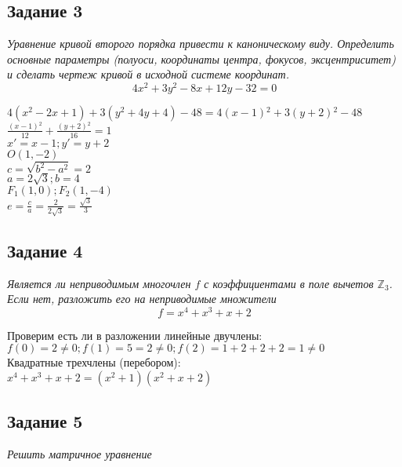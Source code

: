 \documentclass[a4paper]{article}
\theoremstyle{definition}
\theoremstyle{plain}
\begin{document}
\subsection*{Задание 3}

\emph{Уравнение кривой второго порядка привести к каноническому виду.
Определить основные параметры (полуоси, координаты центра, фокусов, эксцентриситет) и сделать чертеж кривой в исходной системе координат.}
\[
4x^{2}+3y^{2}-8x+12y-32=0
\]

$4(x^{2}-2x+1) + 3(y^{2}+4y+4) - 48 = 4(x-1){}^{2} + 3(y + 2){}^{2} - 48$\\
$\frac{(x-1){}^{2}}{12} + \frac{(y+2){}^{2}}{16} = 1$\\
$x' = x - 1; y' = y + 2$\\
$O(1, -2)$\\
$c = \sqrt{b^{2}-a^{2}} = 2$\\
$a = 2\sqrt{3}; b = 4$\\
$F_{1}(1, 0); F_{2}(1, -4)$\\
$e = \frac{c}{a} = \frac{2}{2\sqrt{3}}=\frac{\sqrt{3}}{3}$\\
\subsection*{Задание 4}

\emph{Является ли неприводимым многочлен $f$ с коэффициентами в поле вычетов $\mathbb{Z}_{3}$.
Если нет, разложить его на неприводимые множители}
\[
f = x^{4} + x^{3} + x + 2
\]

Проверим есть ли в разложении линейные двучлены:\\
$f(0) = 2 \neq 0; f(1) = 5 = 2 \neq 0; f(2) = 1 + 2 + 2 + 2 = 1 \neq 0$\\
Квадратные трехчлены (перебором):\\
$
x^{4}+x^{3}+x+2
=
(x^{2} + 1)
(x^{2}+x+2)
$

\subsection*{Задание 5}
\emph{Решить матричное уравнение}
\end{document}
